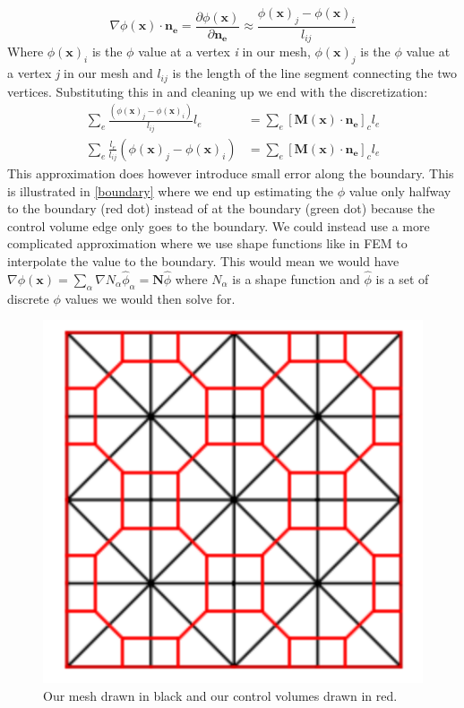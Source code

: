 \begin{equation*}
	\nabla\phi(\mathbf{x})\cdot \mathbf{n_e} = \frac{\partial\phi(\mathbf{x})}{\partial \mathbf{n_e}} \approx \frac{\phi(\mathbf{x})_j - \phi(\mathbf{x})_i}{l_{ij}}
\end{equation*}
Where $\phi(\mathbf{x})_i$ is the $\phi$ value at a vertex \textit{i} in our mesh, $\phi(\mathbf{x})_j$ is the $\phi$ value at a vertex \textit{j} in our mesh and $l_{ij}$ is the length of the line segment connecting the two vertices. Substituting this in and cleaning up we end with the discretization:
\begin{align*}
	\sum_e\frac{(\phi(\mathbf{x})_j - \phi(\mathbf{x})_i)}{l_{ij}}l_e &= \sum_e [\mathbf{M}(\mathbf{x})\cdot \mathbf{n_e}]_cl_e\\
	\sum_e\frac{l_e}{l_{ij}}(\phi(\mathbf{x})_j - \phi(\mathbf{x})_i) &= \sum_e [\mathbf{M}(\mathbf{x})\cdot \mathbf{n_e}]_cl_e
\end{align*}
This approximation does however introduce small error along the boundary. This is illustrated in \autoref{boundary} where we end up estimating the $\phi$ value only halfway to the boundary (red dot) instead of at the boundary (green dot) because the control volume edge only goes to the boundary. We could instead use a more complicated approximation where we use shape functions like in FEM to interpolate the value to the boundary. This would mean we would have $\nabla \phi(\mathbf{x}) = \sum_\alpha \nabla N_{\alpha}\hat{\phi}_{\alpha} = \mathbf{N}\hat{\phi}$ where $N_{\alpha}$ is a shape function and $\hat{\phi}$ is a set of discrete $\phi$ values we would then solve for. 

\begin{figure}
	\centering
	\includegraphics[width=0.5\linewidth]{Materials/ControlVolume}
	\caption{Our mesh drawn in black and our control volumes drawn in red.}
	\label{controlvolume}
\end{figure}

